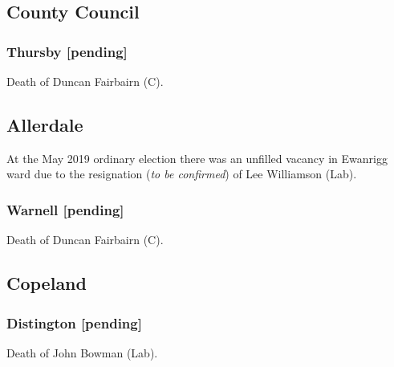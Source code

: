 \documentclass[a4paper,openany]{book}
\begin{document}
\begin{resultsiii}
\subsection*{County Council}

\subsubsection*{Thursby \hspace*{\fill}\nolinebreak[1]%
	\enspace\hspace*{\fill}
	[pending]}


Death of Duncan Fairbairn (C).

\subsection*{Allerdale}

At the May 2019 ordinary election there was an unfilled vacancy in Ewanrigg ward due to the resignation (\emph{to be confirmed}) of Lee Williamson (Lab).

\subsubsection*{Warnell \hspace*{\fill}\nolinebreak[1]%
	\enspace\hspace*{\fill}
	[pending]}


Death of Duncan Fairbairn (C).

\subsection*{Copeland}

\subsubsection*{Distington \hspace*{\fill}\nolinebreak[1]%
	\enspace\hspace*{\fill}
	[pending]}


Death of John Bowman (Lab).


\end{resultsiii}
\end{document}
